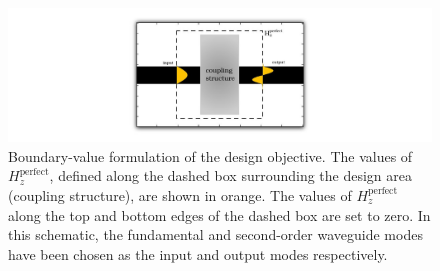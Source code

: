 \begin{figure}[htb]
    \centering
    \includegraphics[width=\textwidth]{p3/intro} 
    \caption{Boundary-value formulation of the design objective.
        The values of $H_z^\text{perfect}$, 
            defined along the dashed box surrounding the design area
            (coupling structure), 
            are shown in orange. 
        The values of $H_z^\text{perfect}$ along the top and bottom edges
            of the dashed box are set to zero.
        In this schematic, the fundamental and second-order waveguide modes
            have been chosen as the input and output modes respectively.}
    \label{fig:intro}
\end{figure}
% 
